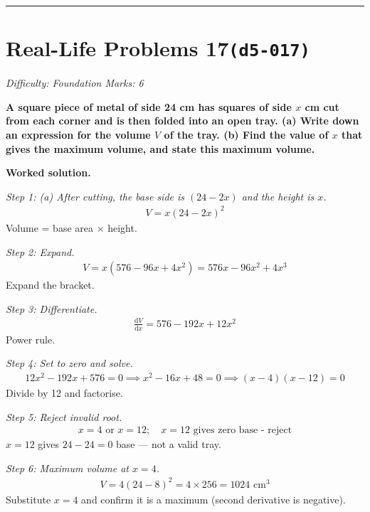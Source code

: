 \documentclass[11pt]{article}
\newcommand{\question}[1]{\par\medskip\noindent\textbf{#1}\par}
\begin{document}
\medskip\hrule

\section*{Real-Life Problems 17\quad\small\texttt{(d5-017)}}
\textit{Difficulty: Foundation \quad\textbar\quad Marks: 6}

\question{A square piece of metal of side 24 cm has squares of side \( x \) cm cut from each corner and is then folded into an open tray. (a) Write down an expression for the volume \( V \) of the tray. (b) Find the value of \( x \) that gives the maximum volume, and state this maximum volume.}

\textbf{Worked solution.}

\textit{Step 1: (a) After cutting, the base side is \( (24 - 2x) \) and the height is \( x \).}
\[\begin{gathered}
V = x(24 - 2x)^2
\end{gathered}\]
Volume = base area \(\times\) height.

\textit{Step 2: Expand.}
\[\begin{gathered}
V = x(576 - 96x + 4x^2) = 576x - 96x^2 + 4x^3
\end{gathered}\]
Expand the bracket.

\textit{Step 3: Differentiate.}
\[\begin{gathered}
\frac{\mathrm{d}V}{\mathrm{d}x} = 576 - 192x + 12x^2
\end{gathered}\]
Power rule.

\textit{Step 4: Set to zero and solve.}
\[\begin{gathered}
12x^2 - 192x + 576 = 0 \implies x^2 - 16x + 48 = 0 \implies (x-4)(x-12) = 0
\end{gathered}\]
Divide by 12 and factorise.

\textit{Step 5: Reject invalid root.}
\[\begin{gathered}
x = 4 \text{ or } x = 12; \quad x = 12 \text{ gives zero base - reject}
\end{gathered}\]
\( x = 12 \) gives \( 24 - 24 = 0 \) base --- not a valid tray.

\textit{Step 6: Maximum volume at \( x = 4 \).}
\[\begin{gathered}
V = 4(24-8)^2 = 4 \times 256 = 1024 \text{ cm}^3
\end{gathered}\]
Substitute \( x = 4 \) and confirm it is a maximum (second derivative is negative).
\end{document}

